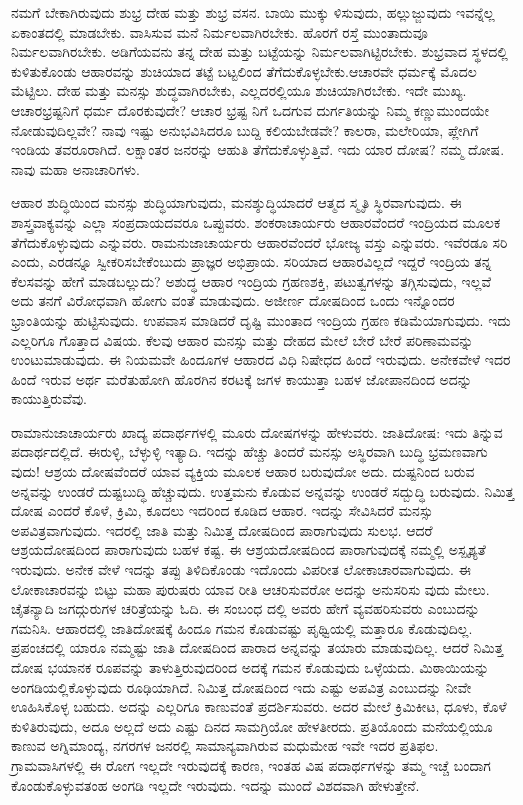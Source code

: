 ನಮಗೆ ಬೇಕಾಗಿರುವುದು ಶುಭ್ರ ದೇಹ ಮತ್ತು ಶುಭ್ರ ವಸನ. ಬಾಯಿ ಮುಕ್ಕು ಳಿಸುವುದು, ಹಲ್ಲುಜ್ಜುವುದು ಇವನ್ನೆಲ್ಲ ಏಕಾಂತದಲ್ಲಿ ಮಾಡಬೇಕು. ವಾಸಿಸುವ ಮನೆ ನಿರ್ಮಲವಾಗಿರಬೇಕು. ಹೊರಗೆ ರಸ್ತೆ ಮುಂತಾದುವೂ ನಿರ್ಮಲವಾಗಿರಬೇಕು. ಅಡಿಗೆಯವನು ತನ್ನ ದೇಹ ಮತ್ತು ಬಟ್ಟೆಯನ್ನು ನಿರ್ಮಲವಾಗಿಟ್ಟಿರಬೇಕು. ಶುಭ್ರವಾದ ಸ್ಥಳದಲ್ಲಿ ಕುಳಿತುಕೊಂಡು ಆಹಾರವನ್ನು ಶುಚಿಯಾದ ತಟ್ಟೆ ಬಟ್ಟಲಿಂದ ತೆಗೆದುಕೊಳ್ಳಬೇಕು.ಆಚಾರವೇ ಧರ್ಮಕ್ಕೆ ಮೊದಲ ಮೆಟ್ಟಿಲು. ದೇಹ ಮತ್ತು ಮನಸ್ಸು ಶುದ್ಧವಾಗಿರಬೇಕು, ಎಲ್ಲದರಲ್ಲಿಯೂ ಶುಚಿಯಾಗಿರಬೇಕು. ಇದೇ ಮುಖ್ಯ. ಆಚಾರಭ್ರಷ್ಟನಿಗೆ ಧರ್ಮ ದೊರಕುವುದೇ? ಆಚಾರ ಭ್ರಷ್ಟ ನಿಗೆ ಒದಗುವ ದುರ್ಗತಿಯನ್ನು ನಿಮ್ಮ ಕಣ್ಣುಮುಂದಯೇ ನೋಡುವುದಿಲ್ಲವೇ? ನಾವು ಇಷ್ಟು ಅನುಭವಿಸಿದರೂ ಬುದ್ದಿ ಕಲಿಯಬೇಡವೇ? ಕಾಲರಾ, ಮಲೇರಿಯಾ, ಪ್ಲೇಗಿಗೆ ಇಂಡಿಯ ತವರೂರಾಗಿದೆ. ಲಕ್ಷಾಂತರ ಜನರನ್ನು ಆಹುತಿ ತೆಗೆದುಕೊಳ್ಳುತ್ತಿವೆ. ಇದು ಯಾರ ದೋಷ? ನಮ್ಮ ದೋಷ. ನಾವು ಮಹಾ ಅನಾಚಾರಿಗಳು.

ಆಹಾರ ಶುದ್ಧಿಯಿಂದ ಮನಸ್ಸು ಶುದ್ಧಿಯಾಗುವುದು, ಮನಶ್ಶುದ್ಧಿಯಾದರೆ ಆತ್ಮದ ಸ್ಮೃತಿ ಸ್ಥಿರವಾಗುವುದು. ಈ ಶಾಸ್ತ್ರವಾಕ್ಯವನ್ನು ಎಲ್ಲಾ ಸಂಪ್ರದಾಯದವರೂ ಒಪ್ಪುವರು. ಶಂಕರಾಚಾರ್ಯರು ಆಹಾರವೆಂದರೆ ಇಂದ್ರಿಯದ ಮೂಲಕ ತೆಗೆದುಕೊಳ್ಳುವುದು ಎನ್ನುವರು. ರಾಮನುಜಾಚಾರ್ಯರು ಆಹಾರವೆಂದರೆ ಭೋಜ್ಯ ವಸ್ತು ಎನ್ನುವರು. ಇವೆರಡೂ ಸರಿ ಎಂದು, ಎರಡನ್ನೂ ಸ್ವೀಕರಿಸಬೇಕೆಂಬುದು ಪ್ರಾಜ್ಞರ ಅಭಿಪ್ರಾಯ. ಸರಿಯಾದ ಆಹಾರವಿಲ್ಲದೆ ಇದ್ದರೆ ಇಂದ್ರಿಯ ತನ್ನ ಕೆಲಸವನ್ನು ಹೇಗೆ ಮಾಡಬಲ್ಲುದು? ಅಶುದ್ಧ ಆಹಾರ ಇಂದ್ರಿಯ ಗ್ರಹಣಶಕ್ತಿ, ಪಟುತ್ವಗಳನ್ನು ತಗ್ಗಿಸುವುದು, ಇಲ್ಲವೆ ಅದು ತನಗೆ ವಿರೋಧವಾಗಿ ಹೋಗು ವಂತೆ ಮಾಡುವುದು. ಅಜೀರ್ಣ ದೋಷದಿಂದ ಒಂದು ಇನ್ನೊಂದರ ಭ್ರಾಂತಿಯನ್ನು ಹುಟ್ಟಿಸುವುದು. ಉಪವಾಸ ಮಾಡಿದರೆ ದೃಷ್ಟಿ ಮುಂತಾದ ಇಂದ್ರಿಯ ಗ್ರಹಣ ಕಡಿಮೆಯಾಗುವುದು. ಇದು ಎಲ್ಲರಿಗೂ ಗೊತ್ತಾದ ವಿಷಯ. ಕೆಲವು ಆಹಾರ ಮನಸ್ಸು ಮತ್ತು ದೇಹದ ಮೇಲೆ ಬೇರೆ ಬೇರೆ ಪರಿಣಾಮವನ್ನು ಉಂಟುಮಾಡುವುದು. ಈ ನಿಯಮವೇ ಹಿಂದೂಗಳ ಆಹಾರದ ವಿಧಿ ನಿಷೇಧದ ಹಿಂದೆ ಇರುವುದು. ಅನೇಕವೇಳೆ ಇದರ ಹಿಂದೆ ಇರುವ ಅರ್ಥ ಮರೆತುಹೋಗಿ ಹೊರಗಿನ ಕರಟಕ್ಕೆ ಜಗಳ ಕಾಯುತ್ತಾ ಬಹಳ ಜೋಪಾನದಿಂದ ಅದನ್ನು ಕಾಯುತ್ತಿರುವೆವು.

ರಾಮಾನುಜಾಚಾರ್ಯರು ಖಾದ್ಯ ಪದಾರ್ಥಗಳಲ್ಲಿ ಮೂರು ದೋಷಗಳನ್ನು ಹೇಳುವರು. ಜಾತಿದೋಷ: ಇದು ತಿನ್ನುವ ಪದಾರ್ಥದಲ್ಲಿದೆ. ಈರುಳ್ಳಿ, ಬೆಳ್ಳುಳ್ಳಿ ಇತ್ಯಾದಿ. ಇದನ್ನು ಹೆಚ್ಚು ತಿಂದರೆ ಮನಸ್ಸು ಅಸ್ಥಿರವಾಗಿ ಬುದ್ಧಿ ಭ್ರಮಣವಾಗು ವುದು! ಆಶ್ರಯ ದೋಷವೆಂದರೆ ಯಾವ ವ್ಯಕ್ತಿಯ ಮೂಲಕ ಆಹಾರ ಬರುವುದೋ ಅದು. ದುಷ್ಟನಿಂದ ಬರುವ ಅನ್ನವನ್ನು ಉಂಡರೆ ದುಷ್ಟಬುದ್ಧಿ ಹೆಚ್ಚುವುದು. ಉತ್ತಮನು ಕೊಡುವ ಅನ್ನವನ್ನು ಉಂಡರೆ ಸದ್ಬುದ್ಧಿ ಬರುವುದು. ನಿಮಿತ್ತ ದೋಷ ಎಂದರೆ ಕೊಳೆ, ಕ್ರಿಮಿ, ಕೂದಲು ಇದರಿಂದ ಕೂಡಿದ ಆಹಾರ. ಇದನ್ನು ಸೇವಿಸಿದರೆ ಮನಸ್ಸು ಅಪವಿತ್ರವಾಗುವುದು. ಇದರಲ್ಲಿ ಜಾತಿ ಮತ್ತು ನಿಮಿತ್ತ ದೋಷದಿಂದ ಪಾರಾಗುವುದು ಸುಲಭ. ಆದರೆ ಆಶ್ರಯದೋಷದಿಂದ ಪಾರಾಗುವುದು ಬಹಳ ಕಷ್ಟ. ಈ ಆಶ್ರಯದೋಷದಿಂದ ಪಾರಾಗುವುದಕ್ಕೆ ನಮ್ಮಲ್ಲಿ ಅಸ್ಪೃಶ್ಯತೆ ಇರುವುದು. ಅನೇಕ ವೇಳೆ ಇದನ್ನು ತಪ್ಪು ತಿಳಿದಿಕೊಂಡು ಇದೊಂದು ವಿಪರೀತ ಲೋಕಾಚಾರವಾಗುವುದು. ಈ ಲೋಕಾಚಾರವನ್ನು ಬಿಟ್ಟು ಮಹಾ ಪುರುಷರು ಯಾವ ರೀತಿ ಆಚರಿಸುವರೋ ಅದನ್ನು ಅನುಸರಿಸು ವುದು ಮೇಲು. ಚೈತನ್ಯಾದಿ ಜಗದ್ಗುರುಗಳ ಚರಿತ್ರೆಯನ್ನು ಓದಿ. ಈ ಸಂಬಂಧ ದಲ್ಲಿ ಅವರು ಹೇಗೆ ವ್ಯವಹರಿಸುವರು ಎಂಬುದನ್ನು ಗಮನಿಸಿ. ಆಹಾರದಲ್ಲಿ ಜಾತಿದೋಷಕ್ಕೆ ಹಿಂದೂ ಗಮನ ಕೊಡುವಷ್ಟು ಪೃಥ್ವಿಯಲ್ಲಿ ಮತ್ತಾರೂ ಕೊಡುವುದಿಲ್ಲ. ಪ್ರಪಂಚದಲ್ಲಿ ಯಾರೂ ನಮ್ಮಷ್ಟು ಜಾತಿ ದೋಷದಿಂದ ಪಾರಾದ ಅನ್ನವನ್ನು ತಯಾರು ಮಾಡುವುದಿಲ್ಲ. ಆದರೆ ನಿಮಿತ್ತ ದೋಷ ಭಯಾನಕ ರೂಪವನ್ನು ತಾಳುತ್ತಿರುವುದರಿಂದ ಅದಕ್ಕೆ ಗಮನ ಕೊಡುವುದು ಒಳ್ಳೆಯದು. ಮಿಠಾಯಿಯನ್ನು ಅಂಗಡಿಯಲ್ಲಿಕೊಳ್ಳುವುದು ರೂಢಿಯಾಗಿದೆ. ನಿಮಿತ್ತ ದೋಷದಿಂದ ಇದು ಎಷ್ಟು ಅಪವಿತ್ರ ಎಂಬುದನ್ನು ನೀವೇ ಊಹಿಸಿಕೊಳ್ಳ ಬಹುದು. ಅದನ್ನು ಎಲ್ಲರಿಗೂ ಕಾಣುವಂತೆ ಪ್ರದರ್ಶಿಸುವರು. ಅದರ ಮೇಲೆ ಕ್ರಿಮಿಕೀಟ, ಧೂಳು, ಕೊಳೆ ಕುಳಿತಿರುವುದು, ಅದೂ ಅಲ್ಲದೆ ಅದು ಎಷ್ಟು ದಿನದ ಸಾಮಗ್ರಿಯೋ ಹೇಳತೀರದು. ಪ್ರತಿಯೊಂದು ಮನೆಯಲ್ಲಿಯೂ ಕಾಣುವ ಅಗ್ನಿಮಾಂದ್ಯ, ನಗರಗಳ ಜನರಲ್ಲಿ ಸಾಮಾನ್ಯವಾಗಿರುವ ಮಧುಮೇಹ ಇವೇ ಇದರ ಪ್ರತಿಫಲ. ಗ್ರಾಮವಾಸಿಗಳಲ್ಲಿ ಈ ರೋಗ ಇಲ್ಲದೇ ಇರುವುದಕ್ಕೆ ಕಾರಣ, ಇಂತಹ ವಿಷ ಪದಾರ್ಥಗಳನ್ನು ತಮ್ಮ ಇಚ್ಚೆ ಬಂದಾಗ ಕೊಂಡುಕೊಳ್ಳುವತಂಹ ಅಂಗಡಿ ಇಲ್ಲದೇ ಇರುವುದು. ಇದನ್ನು ಮುಂದೆ ವಿಶದವಾಗಿ ಹೇಳುತ್ತೇನೆ.

